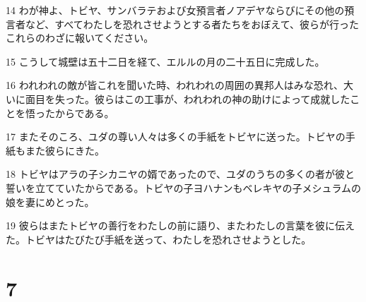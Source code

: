 \par 14 わが神よ、トビヤ、サンバラテおよび女預言者ノアデヤならびにその他の預言者など、すべてわたしを恐れさせようとする者たちをおぼえて、彼らが行ったこれらのわざに報いてください。
\par 15 こうして城壁は五十二日を経て、エルルの月の二十五日に完成した。
\par 16 われわれの敵が皆これを聞いた時、われわれの周囲の異邦人はみな恐れ、大いに面目を失った。彼らはこの工事が、われわれの神の助けによって成就したことを悟ったからである。
\par 17 またそのころ、ユダの尊い人々は多くの手紙をトビヤに送った。トビヤの手紙もまた彼らにきた。
\par 18 トビヤはアラの子シカニヤの婿であったので、ユダのうちの多くの者が彼と誓いを立てていたからである。トビヤの子ヨハナンもベレキヤの子メシュラムの娘を妻にめとった。
\par 19 彼らはまたトビヤの善行をわたしの前に語り、またわたしの言葉を彼に伝えた。トビヤはたびたび手紙を送って、わたしを恐れさせようとした。

\chapter{7}

